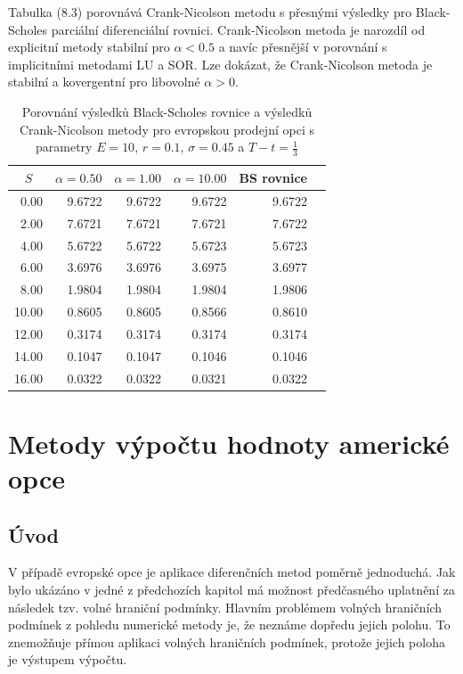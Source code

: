 \documentclass[a4paper]{book}
\begin{document}
Tabulka (8.3) porovnává Crank-Nicolson metodu s přesnými výsledky pro Black-Scholes parciální diferenciální rovnici. Crank-Nicolson metoda je narozdíl od explicitní metody stabilní pro $\alpha < 0.5$ a navíc přesnější v porovnání s implicitními metodami LU a SOR. Lze dokázat, že Crank-Nicolson metoda je stabilní a kovergentní pro libovolné $\alpha > 0$.
\begin{table}
\begin{center}
\begin{tabular}{r r r r r r}
\multicolumn {1}{c}{$S$} &
\multicolumn {1}{c}{$\alpha = 0.50$} &
\multicolumn {1}{c}{$\alpha = 1.00$} &
\multicolumn {1}{c}{$\alpha = 10.00$} &
\multicolumn {1}{c}{BS rovnice} \\
\hline
 0.00 & 9.6722 & 9.6722 & 9.6722 & 9.6722 \\
 2.00 & 7.6721 & 7.6721 & 7.6721 & 7.6722 \\
 4.00 & 5.6722 & 5.6722 & 5.6723 & 5.6723 \\
 6.00 & 3.6976 & 3.6976 & 3.6975 & 3.6977 \\
 8.00 & 1.9804 & 1.9804 & 1.9804 & 1.9806 \\
10.00 & 0.8605 & 0.8605 & 0.8566 & 0.8610 \\
12.00 & 0.3174 & 0.3174 & 0.3174 & 0.3174 \\
14.00 & 0.1047 & 0.1047 & 0.1046 & 0.1046 \\
16.00 & 0.0322 & 0.0322 & 0.0321 & 0.0322 \\
\hline
\end{tabular}
\end{center}
\caption{Porovnání výsledků Black-Scholes rovnice a výsledků Crank-Nicolson metody pro evropskou prodejní opci s parametry $E=10$, $r=0.1$, $\sigma = 0.45$ a $T - t = \frac{1}{3}$}
\end{table}

\chapter{Metody výpočtu hodnoty americké opce}

\section{Úvod}

V případě evropské opce je aplikace diferenčních metod poměrně jednoduchá. Jak bylo ukázáno v jedné z předchozích kapitol má možnost předčasného uplatnění za následek tzv. volné hraniční podmínky. Hlavním problémem volných hraničních podmínek z pohledu numerické metody je, že neznáme dopředu jejich polohu. To znemožňuje přímou aplikaci volných hraničních podmínek, protože jejich poloha je výstupem výpočtu.
\end{document}
